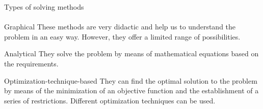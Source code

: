 \documentclass[aspectratio=169]{beamer}
\begin{document}
\begin{frame}[t]{Types of solving methods}
\framesubtitle{}
    \begin{exampleblock}{Graphical}
        These methods are very didactic and help us to understand the problem in an easy way. However, they offer a limited range of possibilities.
    \end{exampleblock}
    
    \begin{exampleblock}{Analytical}
        They solve the problem by means of mathematical equations based on the requirements.
    \end{exampleblock}
    
    \begin{exampleblock}{Optimization-technique-based}
        They can ﬁnd the optimal solution to the problem by means of the minimization of an objective function and the establishment of a series of restrictions. Different optimization techniques can be used.
    \end{exampleblock}

\end{frame}
\end{document}
